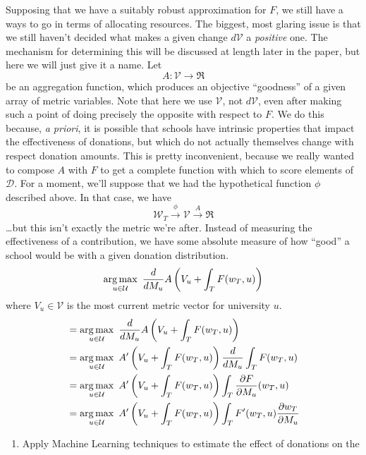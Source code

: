 \documentclass[paper.tex]{subfiles}
\newcommand{\U}{\mathcal{U}}
\newcommand{\D}{\mathcal{D}}
\newcommand{\V}{\mathcal{V}}
\newcommand{\W}{\mathcal{W}}
\begin{document}
	Supposing that we have a suitably robust approximation for $F$, we still have a ways to go in terms of allocating resources. The biggest, most glaring issue is that we still haven't decided what makes a given change $d\V$ a \emph{positive} one. The mechanism for determining this will be discussed at length later in the paper, but here we will just give it a name. Let
	\begin{equation}
		A : \V \to \Re
	\end{equation}
	be an aggregation function, which produces an objective ``goodness'' of a given array of metric variables. Note that here we use $\V$, not $d\V$, even after making such a point of doing precisely the opposite with respect to $F$. We do this because, \emph{a priori}, it is possible that schools have intrinsic properties that impact the effectiveness of donations, but which do not actually themselves change with respect donation amounts. This is pretty inconvenient, because we really wanted to compose $A$ with $F$ to get a complete function with which to score elements of $\D$. For a moment, we'll suppose that we had the hypothetical function $\phi$ described above. In that case, we have
	\[ \W_T \overset{\phi}{\to} \V \overset{A}{\to} \Re \] 
	\ldots but this isn't exactly the metric we're after. Instead of measuring the effectiveness of a contribution, we have some absolute measure of how ``good'' a school would be with a given donation distribution.
	\begin{equation}
		\argmax_{u \in \U}~ \frac{d}{dM_u} A\left(V_u + \int_{T} F(w_T, u)\right)
	\end{equation}
	where $V_u \in \V$ is the most current metric vector for university $u$.  
	\begin{align*}
		&=\argmax_{u \in \U}~ \frac{d}{dM_u} A\left(V_u + \int_{T} F(w_T, u)\right) \\
		&=\argmax_{u \in \U}~  A'\left(V_u + \int_{T} F(w_T, u)\right)\frac{d}{dM_u}\int_{T} F(w_T, u) \\
		&=\argmax_{u \in \U}~  A'\left(V_u + \int_{T} F(w_T, u)\right)\int_{T} \frac{\partial F}{\partial M_u}(w_T, u) \\
		&=\argmax_{u \in \U}~  A'\left(V_u + \int_{T} F(w_T, u)\right)\int_{T} F'(w_T, u) \frac{\partial w_T}{\partial M_u} \\
	\end{align*}
	\begin{enumerate}
		\item Apply Machine Learning techniques to estimate the effect of donations on the 
	\end{enumerate}
\end{document}

